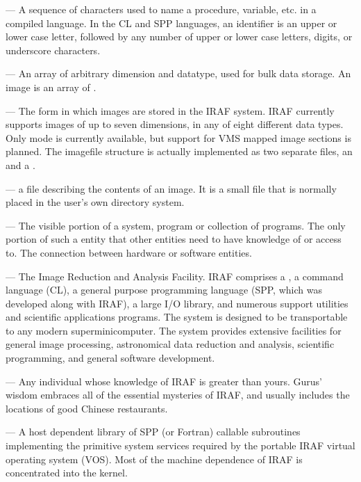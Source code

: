 \medskip \noindent {} --- A sequence of characters used to
name a procedure, variable, etc. in a compiled language.  In the CL and 
SPP languages, an identifier is an upper or lower case letter, followed 
by any number of upper or lower case letters, digits, or underscore characters.

\medskip \noindent {} --- An array of arbitrary dimension 
and datatype, used for bulk data storage.
An image is an array of .

\medskip \noindent {} --- The form in which images are
stored in the IRAF system.  IRAF currently supports images of up to seven
dimensions, in any of eight different data types.
Only  mode is currently available, but support for
VMS mapped image sections is planned.
The imagefile structure is actually implemen\-ted as two separate files,
an  and a .

\medskip \noindent {} --- a file describing the
contents of an image. It is a small file that is normally placed in the
user's own directory system.

\medskip \noindent {} --- The visible portion of a
system, program or collection of programs.  The only portion of such a
entity that other entities need to have knowledge of or access to.
The connection between hardware or software entities.

\medskip \noindent {} --- The Image Reduction and Analysis 
Facility.
IRAF comprises a , a command language
(CL), a general purpose programming language (SPP, which
was developed along with IRAF), a large I/O library, and numerous support
utilities and scientific applications programs.  The system is designed to be
transportable to any modern superminicomputer.  The
system provides extensive facilities for general image processing,
astronomical data reduction and analysis, scientific programming,
and general software development.

\medskip \noindent {} --- Any individual whose knowledge
of IRAF is greater than yours. Gurus' wisdom embraces all of the essential
mysteries of IRAF, and usually includes the locations of good Chinese
restaurants.

\medskip \noindent {} --- A host dependent library of SPP
(or Fortran) callable subroutines implementing the primitive system services
required by the portable IRAF virtual operating system (VOS).  Most of the
machine dependence of IRAF is concentrated into the kernel.

